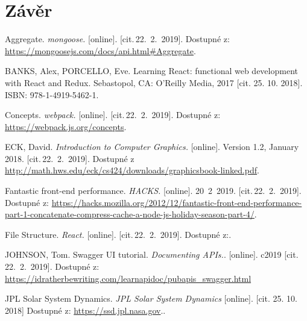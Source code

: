 \documentclass[a4paper,12pt]{article}
\begin{document}
\clearpage {} {}
\section*{Závěr}



\clearpage {} {}

\begin{thebibliography}{99}	%


Aggregate.
\textit{mongoose.} [online]. [cit.\,22.~2.~2019].
Dostupné z: {\ttfamily \url{https://mongoosejs.com/docs/api.html#Aggregate}}.

BANKS, Alex, PORCELLO, Eve. Learning React: functional web development with React and Redux. Sebastopol, CA: O'Reilly Media, 2017 [cit. 25. 10. 2018]. ISBN: 978-1-4919-5462-1.

Concepts.
\textit{webpack.} [online]. [cit.\,22.~2.~2019].
Dostupné z: {\ttfamily \url{https://webpack.js.org/concepts}}.

ECK, David. \textit{Introduction to Computer Graphics.} [online]. Version 1.2, January 2018. [cit.\,22.~2.~2019]. Dostupné z \url{http://math.hws.edu/eck/cs424/downloads/graphicsbook-linked.pdf}.

Fantastic front-end performance.
\textit{HACKS.} [online]. 20~2~2019. [cit.\,22.~2.~2019].
Dostupné z: {\ttfamily \url{https://hacks.mozilla.org/2012/12/fantastic-front-end-performance-part-1-concatenate-compress-cache-a-node-js-holiday-season-part-4/}}.

File Structure.
\textit{React.} [online]. [cit.\,22.~2.~2019].
Dostupné z:.

JOHNSON, Tom. Swagger UI tutorial. \textit{Documenting APIs.}. [online]. c2019 [cit.\,22.~2.~2019]. Dostupné z: {\ttfamily \url{https://idratherbewriting.com/learnapidoc/pubapis_swagger.html}}

JPL Solar System Dynamics. \textit{JPL Solar System Dynamics} [online]. [cit. 25. 10. 2018] Dostupné z: \url{https://ssd.jpl.nasa.gov}..


\end{thebibliography}
\end{document}
